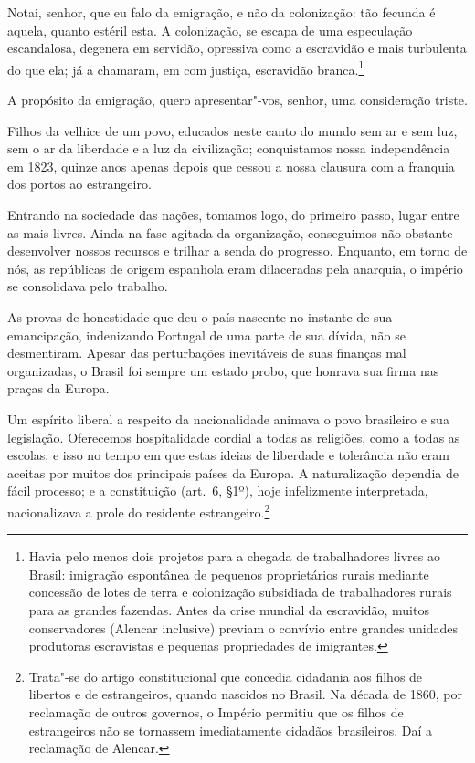 \begin{linenumbers}
 Notai, senhor, que eu falo da emigração, e não da colonização: tão
fecunda é aquela, quanto estéril esta. A colonização, se escapa de uma
especulação escandalosa, degenera em servidão, opressiva como a
escravidão e mais turbulenta do que ela; já a chamaram, em com justiça,
escravidão branca.\footnote{ Havia pelo menos dois projetos para a chegada de trabalhadores 
livres ao Brasil: imigração espontânea de pequenos proprietários rurais mediante concessão 
de lotes de terra e colonização subsidiada de trabalhadores rurais para as grandes fazendas. 
Antes da crise mundial da escravidão, muitos conservadores (Alencar inclusive) previam o 
convívio entre grandes unidades produtoras escravistas e pequenas propriedades de imigrantes.}

 A propósito da emigração, quero apresentar"-vos, senhor, uma
consideração triste. 

 Filhos da velhice de um povo, educados neste canto do mundo sem ar e
sem luz, sem o ar da liberdade e a luz da civilização; conquistamos
nossa independência em 1823, quinze anos apenas depois que cessou 
a nossa clausura com a franquia dos portos ao estrangeiro.

 Entrando na sociedade das nações, tomamos logo, do primeiro passo,
lugar entre as mais livres. Ainda na fase agitada da organização,
conseguimos não obstante desenvolver nossos recursos e trilhar a senda
do progresso. Enquanto, em torno de nós, as repúblicas de origem
espanhola eram dilaceradas pela anarquia, o império se consolidava pelo trabalho.

 As provas de honestidade que deu o país nascente no instante de sua
emancipação, indenizando Portugal de uma parte de sua dívida, não se
desmentiram. Apesar das perturbações inevitáveis de suas finanças mal
organizadas, o Brasil foi sempre um estado probo, que honrava sua firma
nas praças da Europa. 

 Um espírito liberal a respeito da nacionalidade animava o povo
brasileiro e sua legislação. Oferecemos hospitalidade cordial a todas
as religiões, como a todas as escolas; e isso no tempo em que estas
ideias de liberdade e tolerância não eram aceitas por muitos dos
principais países da Europa. A naturalização dependia de fácil
processo; e a constituição (art.~6, §1º), hoje infelizmente interpretada, 
nacionalizava a prole do residente estrangeiro.\footnote{ Trata"-se do artigo constitucional 
que concedia cidadania aos filhos de libertos e de estrangeiros, quando nascidos no Brasil. 
Na década de 1860, por reclamação de outros governos, o Império permitiu que os filhos de 
estrangeiros não se tornassem imediatamente cidadãos brasileiros. Daí a reclamação de Alencar.}


\end{linenumbers}
